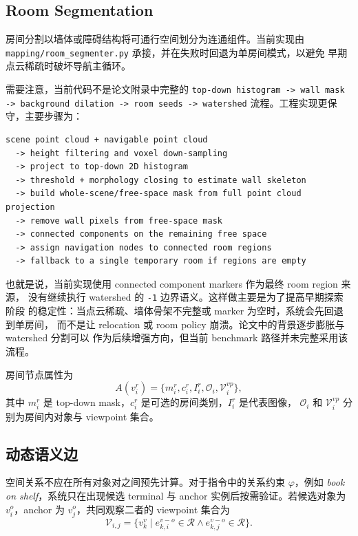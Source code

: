 \documentclass[UTF8,zihao=-4]{ctexart}
\begin{document}
\subsection{Room Segmentation}

房间分割以墙体或障碍结构将可通行空间划分为连通组件。当前实现由
\texttt{mapping/room\_segmenter.py} 承接，并在失败时回退为单房间模式，以避免
早期点云稀疏时破坏导航主循环。

需要注意，当前代码不是论文附录中完整的
\texttt{top-down histogram -> wall mask -> background dilation -> room seeds -> watershed}
流程。工程实现更保守，主要步骤为：

\begin{lstlisting}[style=pseudo,caption={当前 Room Segmentation 工程流程}]
scene point cloud + navigable point cloud
  -> height filtering and voxel down-sampling
  -> project to top-down 2D histogram
  -> threshold + morphology closing to estimate wall skeleton
  -> build whole-scene/free-space mask from full point cloud projection
  -> remove wall pixels from free-space mask
  -> connected components on the remaining free space
  -> assign navigation nodes to connected room regions
  -> fallback to a single temporary room if regions are empty
\end{lstlisting}

也就是说，当前实现使用 connected component markers 作为最终 room region 来源，
没有继续执行 watershed 的 \texttt{-1} 边界语义。这样做主要是为了提高早期探索阶段
的稳定性：当点云稀疏、墙体骨架不完整或 marker 为空时，系统会先回退到单房间，
而不是让 relocation 或 room policy 崩溃。论文中的背景逐步膨胀与 watershed 分割可以
作为后续增强方向，但当前 benchmark 路径并未完整采用该流程。

房间节点属性为
\begin{equation}
  A(v_i^r)=
  \{m_i^r,c_i^r,I_i^r,\mathcal{O}_i,\mathcal{V}_i^{vp}\},
\end{equation}
其中 $m_i^r$ 是 top-down mask，$c_i^r$ 是可选的房间类别，$I_i^r$ 是代表图像，
$\mathcal{O}_i$ 和 $\mathcal{V}_i^{vp}$ 分别为房间内对象与 viewpoint 集合。

\subsection{动态语义边}

空间关系不应在所有对象对之间预先计算。对于指令中的关系约束
$\varphi$，例如 \textit{book on shelf}，系统只在出现候选 terminal 与 anchor
实例后按需验证。若候选对象为 $v_i^o$，anchor 为 $v_j^o$，共同观察二者的
viewpoint 集合为
\begin{equation}
  \mathcal{V}_{i,j}
  =
  \{v_k^v
  \mid
  e_{k,i}^{v-o}\in\mathcal{R}
  \land
  e_{k,j}^{v-o}\in\mathcal{R}
  \}.
  \label{eq:shared_views}
\end{equation}
\end{document}
